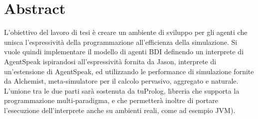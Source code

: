 \chapter*{Abstract} %




L'obiettivo del lavoro di tesi è creare un ambiente di sviluppo per gli agenti che unisca l'espressività della programmazione all'efficienza della simulazione.
Si vuole quindi implementare il modello di agenti BDI definendo un interprete di AgentSpeak ispirandosi all'espressività fornita da Jason, interprete di un'estensione di AgentSpeak, ed utilizzando le performance di simulazione fornite da Alchemist, meta-simulatore per il calcolo pervasivo, aggregato e naturale.
L'unione tra le due parti sarà sostenuta da tuProlog, libreria che supporta la programmazione multi-paradigma, e che permetterà inoltre di portare l'esecuzione dell'interprete anche su ambienti reali, come ad esempio JVM).

\clearpage{\pagestyle{empty}\cleardoublepage}

\tableofcontents

\rhead[\fancyplain{}{\bfseries\leftmark}]{\fancyplain{}{\bfseries\thepage}}

\clearpage{\pagestyle{empty}\cleardoublepage}

\listoffigures

\clearpage{\pagestyle{empty}\cleardoublepage}


\clearpage{\pagestyle{empty}\cleardoublepage}

\lstlistoflistings

\clearpage{\pagestyle{empty}\cleardoublepage}